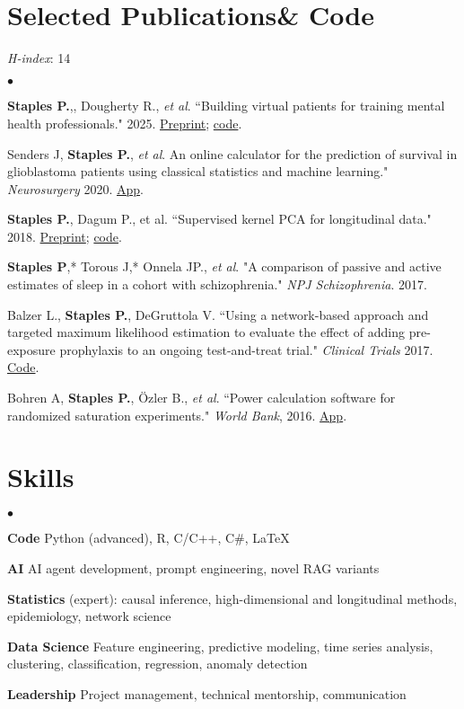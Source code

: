 \documentclass[margin,line]{res}
\newenvironment{bulletlist}{
  \begin{list}{$\bullet$}{%
      \setlength{\itemsep}{0in}
      \setlength{\parsep}{0in}
      \setlength{\parskip}{0in}
      \setlength{\topsep}{0in}
      \setlength{\partopsep}{0in}
      \setlength{\leftmargin}{0.15in}
      \setlength{\labelwidth}{0.05in}
      \setlength{\labelsep}{0.1in}
      \setlength{\itemindent}{0in}
      \setlength{\rightmargin}{0in}}}
  {\end{list}}
\begin{document}
\begin{resume}
\ \\[-1cm]
\section{\sc Selected Publications\quad\quad \& Code}
{\it H-index}: 14 \\

\begin{bulletlist}
\item {\bf Staples P.},, Dougherty R., {\it et al}. ``Building virtual patients for training mental health professionals." 2025. \href{https://osf.io/preprints/psyarxiv/epqtc_v2}{Preprint}; \href{https://github.com/compasspathways/ai-patient-demo/}{code}.
\item Senders J, \textbf{Staples P.}, {\it et al}. An online calculator for the prediction of survival in glioblastoma patients using classical statistics and machine learning." {\it Neurosurgery} 2020. \href{https://cnoc-bwh.shinyapps.io/gbmsurvivalpredictor/}{App}.
\item \textbf{Staples P.}, Dagum P., et al. ``Supervised kernel PCA for longitudinal data." 2018. \href{https://arxiv.org/abs/1808.06638}{Preprint}; \href{https://pypi.org/project/sklPCA/}{code}.
\item {\bf Staples P},* Torous J,* Onnela JP., {\it et al}. "A comparison of passive and active estimates of sleep in a cohort with schizophrenia." {\it NPJ Schizophrenia}. 2017.
\item Balzer L., {\bf Staples P.}, DeGruttola V. ``Using a network-based approach and targeted maximum likelihood estimation to evaluate the effect of adding pre-exposure prophylaxis to an ongoing test-and-treat trial." {\it Clinical Trials} 2017. \href{https://github.com/ctphoenix/HIV-PrEP-Simulation}{Code}.
\item Bohren A, {\bf Staples P.}, Özler B., {\it et al}. ``Power calculation software for randomized saturation experiments." {\it World Bank}, 2016. \href{https://blogs.worldbank.org/en/impactevaluations/power-calculation-software-randomized-saturation-experiments}{App}.
\end{bulletlist}

\section{\sc Skills}
\begin{bulletlist}
\item {\bf Code} Python (advanced), R, C/C++, C\#, \LaTeX
\item {\bf AI} AI agent development, prompt engineering, novel RAG variants
\item {\bf Statistics} (expert): causal inference, high-dimensional and longitudinal methods, epidemiology, network science
\item {\bf Data Science} Feature engineering, predictive modeling, time series analysis, clustering, classification, regression, anomaly detection
\item {\bf Leadership} Project management, technical mentorship, communication
\end{bulletlist}

\end{resume}
\end{document}
